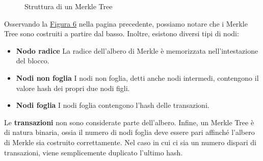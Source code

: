 \documentclass[12pt]{report}
\begin{document}
\begin{itemize}[topsep=5pt, itemsep=0pt]
\begin{figure}[H]
        \captionsetup{justification=centering}
        \caption{Struttura di un Merkle Tree \cite{Due}}
        \label{fig:Merkle}
    \end{figure}
    \newpage
    Osservando la \hyperref[fig:Merkle]{Figura 6} nella pagina precedente, possiamo notare che i Merkle Tree sono costruiti a partire dal basso.\newline
    Inoltre, esistono diversi tipi di nodi:
    \begin{itemize}[topsep=-2pt, itemsep=0pt, label={$-$}]
        \item \textbf{Nodo radice}\newline
        La radice dell'albero di Merkle è memorizzata nell'intestazione del blocco.
        \item \textbf{Nodi non foglia}\newline
        I nodi non foglia, detti anche nodi intermedi, contengono il valore hash dei propri due nodi figli.
        \item \textbf{Nodi foglia}\newline
        I nodi foglia contengono l'hash delle transazioni.
    \end{itemize}
    Le \textbf{transazioni} non sono considerate parte dell'albero.\newline
    Infine, un Merkle Tree è di natura binaria, ossia il numero di nodi foglia deve essere pari affinché l'albero di Merkle sia costruito correttamente. Nel caso in cui ci sia un numero dispari di transazioni, viene semplicemente duplicato l'ultimo hash. \cite{Due} \newpage
\end{itemize}
\end{document}

